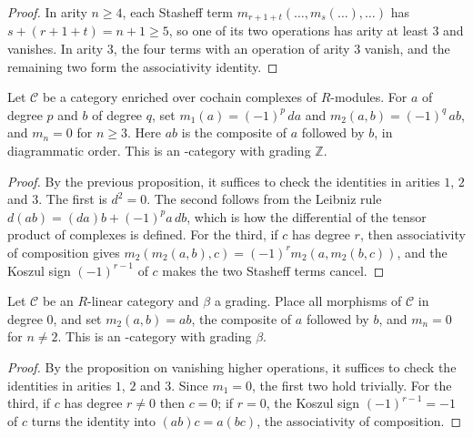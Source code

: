 \begin{proof}
\leanok
In arity $n \geq 4$, each Stasheff term $m_{r+1+t}(\dots, m_s(\dots), \dots)$ has
$s + (r + 1 + t) = n + 1 \geq 5$, so one of its two operations has arity at least $3$ and
vanishes. In arity $3$, the four terms with an operation of arity $3$ vanish, and the remaining
two form the associativity identity.
\end{proof}

\begin{proposition}
\label{AInfinityTheory.DGCategory.aInfinityCategory}
\leanok
{}
Let $\mathcal{C}$ be a category enriched over cochain complexes of $R$-modules. For $a$ of
degree $p$ and $b$ of degree $q$, set $m_1(a) = (-1)^p\, da$ and $m_2(a, b) = (-1)^q\, a b$,
and $m_n = 0$ for $n \geq 3$. Here $ab$ is the composite of $a$ followed by $b$, in
diagrammatic order. This is an \Ainf{}-category with grading $\mathbb{Z}$.
\end{proposition}

\begin{proof}
\leanok
By the previous proposition, it suffices to check the identities in arities $1$, $2$ and $3$.
The first is $d^2 = 0$. The second follows from the Leibniz rule
$d(ab) = (da)b + (-1)^p a\, db$, which is how the differential of the tensor product of
complexes is defined. For the third, if $c$ has degree $r$, then associativity of composition
gives $m_2(m_2(a, b), c) = (-1)^r m_2(a, m_2(b, c))$, and the Koszul sign $(-1)^{r-1}$ of $c$
makes the two Stasheff terms cancel.
\end{proof}

\begin{proposition}
\label{AInfinityTheory.AInfinityCategory.ofLinearCategory}
\leanok
{}
Let $\mathcal{C}$ be an $R$-linear category and $\beta$ a grading. Place all morphisms of
$\mathcal{C}$ in degree $0$, and set $m_2(a, b) = ab$, the composite of $a$ followed by $b$,
and $m_n = 0$ for $n \neq 2$. This is an \Ainf{}-category with grading $\beta$.
\end{proposition}

\begin{proof}
\leanok
By the proposition on vanishing higher operations, it suffices to check the identities in
arities $1$, $2$ and $3$. Since $m_1 = 0$, the first two hold trivially. For the third, if $c$
has degree $r \neq 0$ then $c = 0$; if $r = 0$, the Koszul sign $(-1)^{r-1} = -1$ of $c$ turns
the identity into $(ab)c = a(bc)$, the associativity of composition.
\end{proof}

